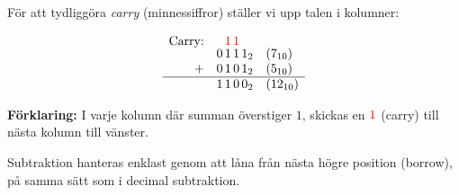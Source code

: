 \documentclass[
  swedish,
  letterpaper,
  oneside,
  openany]{book}
\begin{document}
\begin{tcolorbox}[enhanced jigsaw, arc=.35mm, bottomrule=.15mm, bottomtitle=1mm, breakable, colback=white, colbacktitle=quarto-callout-note-color!10!white, colframe=quarto-callout-note-color-frame, coltitle=black, left=2mm, leftrule=.75mm, opacityback=0, opacitybacktitle=0.6, rightrule=.15mm, title=\textcolor{quarto-callout-note-color}{\faInfo}\hspace{0.5em}{Exempel: Binär addition (\(7_{10} + 5_{10}\))}, titlerule=0mm, toprule=.15mm, toptitle=1mm]

För att tydliggöra \emph{carry} (minnessiffror) ställer vi upp talen i
kolumner:

\[
\begin{array}{r@{\quad}c@{\,}c@{\,}c@{\,}c@{\quad}l}
  \text{Carry:} & \color{red}{\phantom{1}} & \color{red}{1} & \color{red}{1} & \color{red}{\phantom{1}} & \\[-0.5ex]
  & 0 & 1 & 1 & 1_2 & (7_{10}) \\
+ & 0 & 1 & 0 & 1_2 & (5_{10}) \\
\hline
  & 1 & 1 & 0 & 0_2 & (12_{10})
\end{array}
\]

\textbf{Förklaring:} I varje kolumn där summan överstiger \(1\), skickas
en \(\color{red}{1}\) (carry) till nästa kolumn till vänster.

\end{tcolorbox}

Subtraktion hanteras enklast genom att låna från nästa högre position
(borrow), på samma sätt som i decimal subtraktion.
\end{document}
